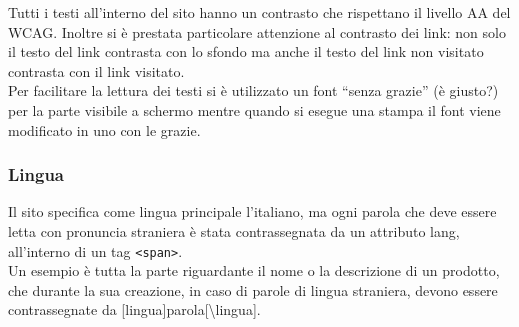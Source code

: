 \documentclass[a4paper, 11pt]{article}
\begin{document}
Tutti i testi all'interno del sito hanno un contrasto che rispettano il livello AA del WCAG. Inoltre si è prestata particolare attenzione al contrasto dei link: non solo il testo del link contrasta con lo sfondo ma anche il testo del link non visitato contrasta con il link visitato. \\
Per facilitare la lettura dei testi si è utilizzato un font “senza grazie” (è giusto?) per la parte visibile a schermo mentre quando si esegue una stampa il font viene modificato in uno con le grazie. 

\subsubsection{Lingua}
Il sito specifica come lingua principale l’italiano, ma ogni parola che deve essere letta con pronuncia straniera è stata contrassegnata da un attributo lang, all’interno di un tag \texttt{<span>}. \\
Un esempio è tutta la parte riguardante il nome o la descrizione di un prodotto, che durante la sua creazione, in caso di parole di lingua straniera,  devono essere contrassegnate da [lingua]parola[\textbackslash lingua].
\end{document}
